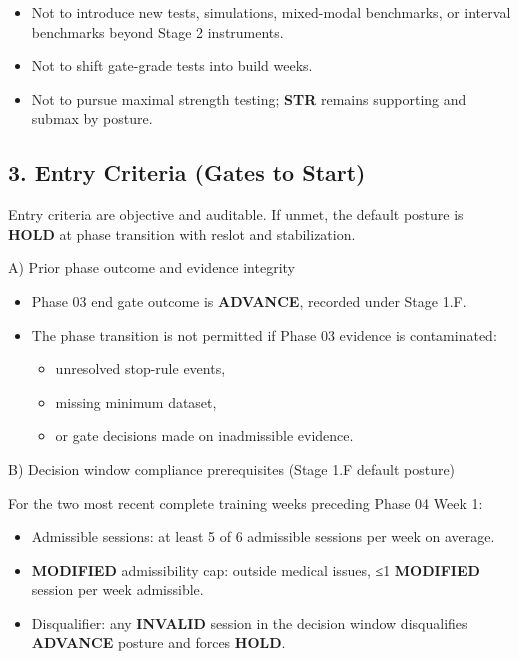 \documentclass[10pt]{article}
\begin{document}
\begin{itemize}
\item Not to introduce new tests, simulations, mixed-modal benchmarks, or interval benchmarks beyond Stage 2 instruments.
\item Not to shift gate-grade tests into build weeks.
\item Not to pursue maximal strength testing; \textbf{STR} remains supporting and submax by posture.
\end{itemize}

\subsection*{3. Entry Criteria (Gates to Start)}


Entry criteria are objective and auditable. If unmet, the default posture is \textbf{HOLD} at phase transition with reslot and stabilization.

A) Prior phase outcome and evidence integrity

\begin{itemize}
\item Phase 03 end gate outcome is \textbf{ADVANCE}, recorded under Stage 1.F.
\item The phase transition is not permitted if Phase 03 evidence is contaminated:
  \begin{itemize}
  \item unresolved stop-rule events,
  \item missing minimum dataset,
  \item or gate decisions made on inadmissible evidence.
  \end{itemize}
\end{itemize}

B) Decision window compliance prerequisites (Stage 1.F default posture)

For the two most recent complete training weeks preceding Phase 04 Week 1:

\begin{itemize}
\item Admissible sessions: at least 5 of 6 admissible sessions per week on average.
\item \textbf{MODIFIED} admissibility cap: outside medical issues, ≤1 \textbf{MODIFIED} session per week admissible.
\item Disqualifier: any \textbf{INVALID} session in the decision window disqualifies \textbf{ADVANCE} posture and forces \textbf{HOLD}.
\end{itemize}
\end{document}
